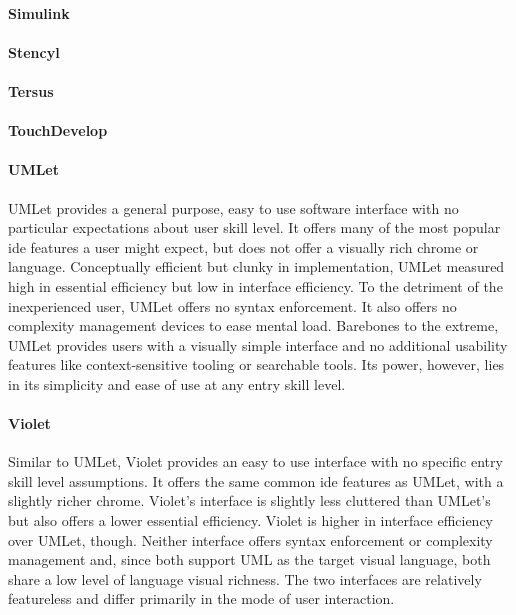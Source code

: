 \paragraph{Simulink}

\paragraph{Stencyl}

\paragraph{Tersus}

\paragraph{TouchDevelop}

\paragraph{UMLet} UMLet provides a general purpose, easy to use software
interface with no particular expectations about user skill level. It offers
many of the most popular \ac{ide} features a user might expect, but does
not offer a visually rich chrome or language. Conceptually efficient but
clunky in implementation, UMLet measured high in essential efficiency but
low in interface efficiency. To the detriment of the inexperienced user,
UMLet offers no syntax enforcement. It also offers no complexity management
devices to ease mental load. Barebones to the extreme, UMLet provides users
with a visually simple interface and no additional usability features like
context-sensitive tooling or searchable tools. Its power, however, lies in
its simplicity and ease of use at any entry skill level.

\paragraph{Violet} Similar to UMLet, Violet provides an easy to use
interface with no specific entry skill level assumptions. It offers the
same common \ac{ide} features as UMLet, with a slightly richer chrome.
Violet's interface is slightly less cluttered than UMLet's but also offers
a lower essential efficiency. Violet is higher in interface efficiency over
UMLet, though. Neither interface offers syntax enforcement or complexity
management and, since both support UML as the target visual language, both
share a low level of language visual richness. The two interfaces are
relatively featureless and differ primarily in the mode of user
interaction.

